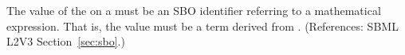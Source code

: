The value of the   on a \Delay must be an SBO
identifier referring to a mathematical expression.  That is, the value
must be a term derived from \sbomathformula.  (References: SBML
L2V3 Section~\ref{sec:sbo}.)
